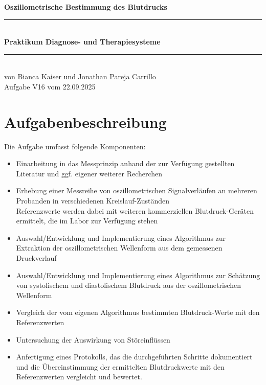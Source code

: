 \documentclass[a4paper, 11pt]{scrartcl}
\begin{document}

\begin{center}
{\LARGE \bfseries Oszillometrische Bestimmung des Blutdrucks }\\[6pt]
\rule{\linewidth}{0.4pt}
\phantom{hi} \\[-4pt]
{\Large \bfseries Praktikum Diagnose- und Therapiesysteme} \\[8pt] 
\rule{\linewidth}{0.4pt}
\phantom{hi} \\[-4pt]
{\large von Bianca Kaiser und Jonathan Pareja Carrillo} \\[4pt]
{\large Aufgabe V16 vom 22.09.2025}
\end{center}
\vspace{5pt}


\tableofcontents
\newpage

\section*{Aufgabenbeschreibung}

Die Aufgabe umfasst folgende Komponenten:
\begin{itemize}
    \item Einarbeitung in das Messprinzip anhand der zur Verfügung gestellten Literatur und ggf. eigener weiterer Recherchen
    \item Erhebung einer Messreihe von oszillometrischen Signalverläufen an mehreren Probanden in verschiedenen Kreislauf-Zuständen \\ Referenzwerte werden dabei mit weiteren kommerziellen Blutdruck-Geräten ermittelt, die im Labor zur Verfügung stehen
    \item Auswahl/Entwicklung und Implementierung eines Algorithmus zur Extraktion der oszillometrischen Wellenform aus dem gemessenen Druckverlauf
    \item Auswahl/Entwicklung und Implementierung eines Algorithmus zur Schätzung von systolischem und diastolischem Blutdruck aus der oszillometrischen Wellenform
    \item Vergleich der vom eigenen Algorithmus bestimmten Blutdruck-Werte mit den Referenzwerten
    \item Untersuchung der Auswirkung von Störeinflüssen
    \item Anfertigung eines Protokolls, das die durchgeführten Schritte dokumentiert und die Übereinstimmung der ermittelten Blutdruckwerte mit den Referenzwerten vergleicht und bewertet. 
\end{itemize}
\end{document}
